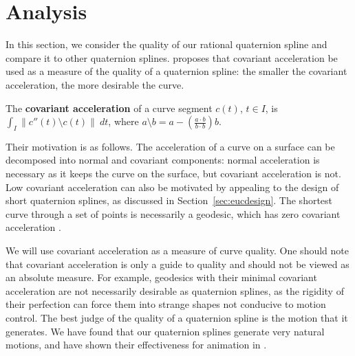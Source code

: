 \section{Analysis}
\label{sec:results}

In this section, we consider the quality of our rational quaternion
spline and compare it to other quaternion splines.
\cite{barr92} proposes that covariant acceleration
be used as a measure of the quality of a quaternion spline:
the smaller the covariant acceleration, the more desirable the curve.
%
\begin{defn2}
The {\bf covariant acceleration} of a curve segment $c(t)$, $t \in I$, is 
$\int_I \| c''(t) \setminus c(t)\| \ dt$, where
$a \setminus b = a - (\frac{a \cdot b}{b \cdot b}) b$.
\end{defn2}
%
Their motivation is as follows.
The acceleration of a curve on a surface can be decomposed into
normal and covariant components: normal acceleration is necessary
as it keeps the curve on the surface, but covariant acceleration
is not.
%
Low covariant acceleration can also be motivated by appealing to the 
design of short quaternion splines, as discussed in 
Section~\ref{sec:eucdesign}.
The shortest curve through a set of points is necessarily a geodesic,
which has zero covariant acceleration \cite{thorpe79}.
	
We will use covariant acceleration as a measure of curve quality.
One should note that covariant acceleration is only a guide to quality
and should not be viewed as an absolute measure.
For example, geodesics with their minimal covariant acceleration
are not necessarily desirable as quaternion splines, as
the rigidity of their perfection can force them into strange shapes
not conducive to motion control.
The best judge of the quality of a quaternion spline
is the motion that it generates.
We have found that our quaternion splines generate very natural motions,
and have shown their effectiveness for animation in \cite{jjjw95}.

